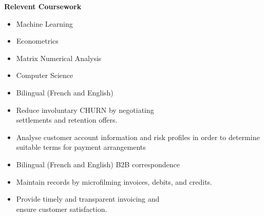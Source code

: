 \documentclass[12pt,a4paper,ragged2e]{altacv}
\begin{document}


\textbf{Relevent Coursework}
\begin{itemize}
    \item Machine Learning
    \item Econometrics
    \item Matrix Numerical Analysis
    \item Computer Science
\end{itemize}
\begin{itemize}
\item Bilingual (French and English)
\smallskip
\item Reduce involuntary CHURN by negotiating \\ settlements and retention offers. 
\smallskip
\item Analyse customer account information and risk profiles in order to determine suitable terms for payment arrangements 
\smallskip
\end{itemize}
{}
\begin{itemize}
\item Bilingual (French and English) B2B correspondence
\smallskip
\item Maintain records by microfilming invoices, debits, and credits.
\smallskip
\item Provide timely and transparent invoicing and \\ ensure customer satisfaction.
\smallskip
\end{itemize}


\end{document}

